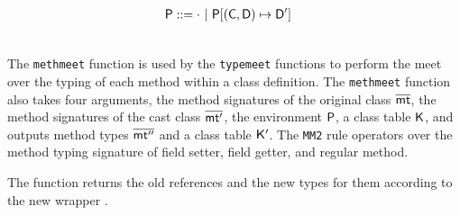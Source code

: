 \documentclass[a4paper,USenglish]{tex/lipics-v2016}
\begin{document}
\opdef{
  $\tmeet{\t}{\tp}\P\K = \tpp\,\Kp$
}{
}
\begin{align*}
\P &::= \cdot \B \Map\P{\Bind{(\C,\D)}\Dp}
\end{align*}
\begin{mathpar}




\end{mathpar}
\\


The \texttt{methmeet} function is used by the \texttt{typemeet} functions to
perform the meet over the typing of each method within a class definition.
The \texttt{methmeet} function also takes four arguments, the method
signatures of the original class $\b\mt$, the method signatures of the cast
class $\b\mtp$, the environment $\P$, a class table $\K$, and outputs method
types $\b\mtpp$ and a class table $\Kp$. The \texttt{MM2} rule operators
over the method typing signature of field setter, field getter, and regular
method.

The function \ftypes\a\C\s\K returns the old references and the new types
for them according to the new wrapper \C.
\end{document}
